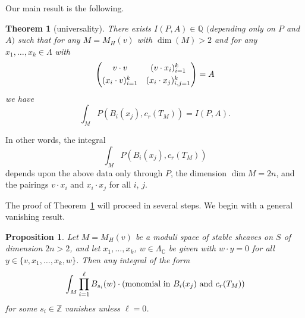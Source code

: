 \documentclass[pdftex]{sigma}
\numberwithin{equation}{section}
\newtheorem{thm}[Theorem]{Theorem}
\newtheorem{prop}[Theorem]{Proposition}
 { \theoremstyle{definition}
\newtheorem{Definition}[Theorem]{Definition}
\newtheorem{Note}[Theorem]{Note}
\newtheorem{Example}[Theorem]{Example}
\newtheorem{Remark}[Theorem]{Remark}
\newtheorem{rmk}[Theorem]{Remark} }
\newcommand{\BC}{{\mathbb{C}}}
\newcommand{\BQ}{{\mathbb{Q}}}
\newcommand{\BZ}{{\mathbb{Z}}}
\newcommand{\1}{\mathsf{1}}
\begin{document}
Our main result is the following.

\begin{thm}[universality] \label{thm:universality}
There exists $I(P,A) \in \BQ$ $($depending only on $P$ and $A)$ such that
for any $M = M_H(v)$ with $\dim(M)>2$ and for any $x_1, \dots, x_k \in \Lambda$ with
\begin{equation} \label{intersection matrix} \begin{pmatrix}
v \cdot v & (v \cdot x_i)_{i=1}^k \vspace{1mm}\\
(x_i \cdot v)_{i=1}^{k} & ( x_{i} \cdot x_j )_{i,j=1}^{k}
\end{pmatrix} = A \end{equation}
we have
\[ \int_{M} P( B_i(x_j), c_r(T_M) ) = I(P,A). \]
\end{thm}

In other words, the integral
\[ \int_{M} P( B_i(x_j) , c_r(T_M) ) \]
depends upon the above data only through $P$,
the dimension $\dim M = 2n$,
and the pairings $v \cdot x_i$ and $x_i \cdot x_j$ for all $i$, $j$.

The proof of Theorem~\ref{thm:universality} will proceed in several steps.
We begin with a general vanishing result.
\begin{prop} \label{prop:vanishing}
Let $M=M_H(v)$ be a moduli space of stable sheaves on $S$ of dimension $2n>2$,
and let $x_1, \dots, x_k$, $w \in \Lambda_{\BC}$ be given with $w \cdot y = 0$ for all $y \in \{ v, x_1, \dots, x_k, w \}$.
Then any integral of the form
\begin{equation} \label{monomial}
\int_{M} \prod_{i=1}^{\ell} B_{s_i}(w) \cdot (\textup{monomial in } B_i(x_j) \textup{ and } c_r(T_M))
\end{equation}
for some $s_i \in \BZ$ vanishes unless $\ell=0$.
\end{prop}
\end{document}
